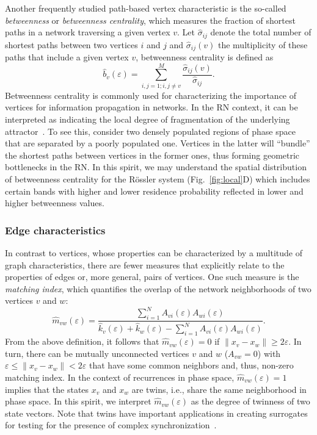 Another frequently studied path-based vertex characteristic is the so-called \textit{betweenness} or \textit{betweenness centrality}, which measures the fraction of shortest paths in a network traversing a given vertex $v$. Let $\hat{\sigma}_{ij}$ denote the total number of shortest paths between two vertices $i$ and $j$ and $\hat{\sigma}_{ij}(v)$ the multiplicity of these paths that include a given vertex $v$, betweenness centrality is defined as
\begin{equation}
\hat{b}_v(\varepsilon)=\sum_{i,j=1; i,j\neq v}^M \frac{\hat{\sigma}_{ij}(v)}{\hat{\sigma}_{ij}}.
\label{eq:betweenness}
\end{equation}
\noindent
Betweenness centrality is commonly used for characterizing the importance of vertices for information propagation in networks. In the RN context, it can be interpreted as indicating the local degree of fragmentation of the underlying attractor~\cite{Donner2010NJP}. To see this, consider two densely populated regions of phase space that are separated by a poorly populated one. Vertices in the latter will ``bundle'' the shortest paths between vertices in the former ones, thus forming geometric bottlenecks in the RN. In this spirit, we may understand the spatial distribution of betweenness centrality for the R\"ossler system (Fig.~\ref{fig:local}D) which includes certain bands with higher and lower residence probability reflected in lower and higher betweenness values.
           
        
  		\subsubsection{Edge characteristics}
        
In contrast to vertices, whose properties can be characterized by a multitude of graph characteristics, there are fewer measures that explicitly relate to the properties of edges or, more general, pairs of vertices. One such measure is the \textit{matching index}, which quantifies the overlap of the network neighborhoods of two vertices $v$ and $w$:
\begin{equation}
\hat{m}_{vw}(\varepsilon)=\frac{\sum_{i=1}^N A_{vi}(\varepsilon) A_{wi}(\varepsilon)}{\hat{k}_v(\varepsilon)+\hat{k}_w(\varepsilon)-\sum_{i=1}^N A_{vi}(\varepsilon) A_{wi}(\varepsilon)}.
\label{eq:matching}
\end{equation}
\noindent
From the above definition, it follows that $\hat{m}_{vw}(\varepsilon)=0$ if $\|x_v-x_w\|\geq 2\varepsilon$. In turn, there can be mutually unconnected vertices $v$ and $w$ ($A_{vw}=0$) with $\varepsilon\leq \|x_v-x_w\|< 2\varepsilon$ that have some common neighbors and, thus, non-zero matching index. In the context of recurrences in phase space, $\hat{m}_{vw}(\varepsilon)=1$ implies that the states $x_v$ and $x_w$ are twins, i.e., share the same neighborhood in phase space. In this spirit, we interpret $\hat{m}_{vw}(\varepsilon)$ as the degree of twinness of two state vectors. Note that twins have important applications in creating surrogates for testing for the presence of complex synchronization~\cite{Thiel2006,Romano2009}.

